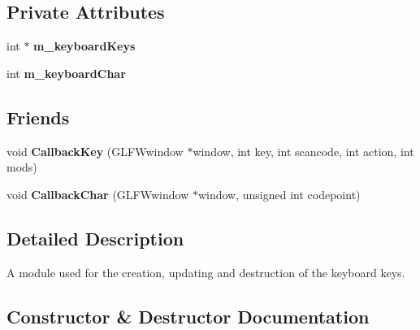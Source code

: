 \subsection*{Private Attributes}
\begin{DoxyCompactItemize}
\item 
\mbox{\label{class_flounder_1_1_keyboard_a60f801e93ee9e2042f710f67308c7c44}} 
int $\ast$ {\bfseries m\+\_\+keyboard\+Keys}
\item 
\mbox{\label{class_flounder_1_1_keyboard_af6ed6a27b193cb92809cec62b04d47cb}} 
int {\bfseries m\+\_\+keyboard\+Char}
\end{DoxyCompactItemize}
\subsection*{Friends}
\begin{DoxyCompactItemize}
\item 
\mbox{\label{class_flounder_1_1_keyboard_afb393f3907595ba101ddb1c3df5ec1bc}} 
void {\bfseries Callback\+Key} (G\+L\+F\+Wwindow $\ast$window, int key, int scancode, int action, int mods)
\item 
\mbox{\label{class_flounder_1_1_keyboard_af633924453badad6081301b11c47f054}} 
void {\bfseries Callback\+Char} (G\+L\+F\+Wwindow $\ast$window, unsigned int codepoint)
\end{DoxyCompactItemize}


\subsection{Detailed Description}
A module used for the creation, updating and destruction of the keyboard keys. 



\subsection{Constructor \& Destructor Documentation}
\mbox{\label{class_flounder_1_1_keyboard_a724d7fe1f8ed1679205dd6c930591b98}} 
